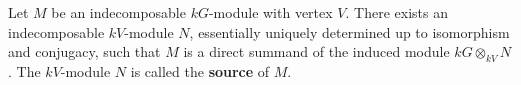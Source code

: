 Let $M$ be an indecomposable $kG$-module with vertex $V$. There exists an indecomposable $kV$-module $N$, essentially uniquely determined up to isomorphism and conjugacy, such that $M$ is a direct summand of the induced module $kG \otimes_{kV} N$. The $kV$-module $N$ is called the \textbf{source} of $M$.

